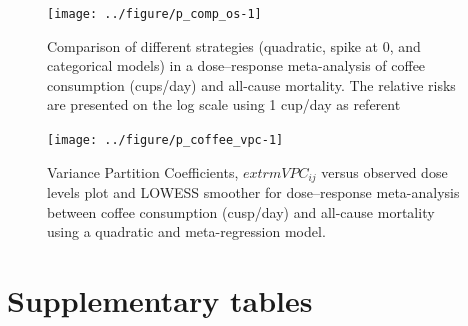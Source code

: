 \documentclass[11pt,a4paper,twoside,openany]{book}\usepackage{knitr}
\begin{document}
{\begin{knitrout}
\begin{figure}[ht!]
{\centering \texttt{[image: ../figure/p\_comp\_os-1]} 

}

\caption[Comparison of different strategies (quadratic, spike at 0, and categorical models) in a dose--response meta-analysis of coffee consumption (cups/day) and all-cause mortality]{Comparison of different strategies (quadratic, spike at 0, and categorical models) in a dose--response meta-analysis of coffee consumption (cups/day) and all-cause mortality. The relative risks are presented on the log scale using 1 cup/day as referent}\label{fig:p_comp_os}
\end{figure}


\end{knitrout}

\begin{knitrout}\footnotesize
{}\color{fgcolor}\begin{figure}[ht!]

{\centering \texttt{[image: ../figure/p\_coffee\_vpc-1]} 

}

\caption[Variance Partition Coefficients, $	extrm{VPC}_{ij}$ versus observed dose levels plot and LOWESS smoother for dose--response meta-analysis between coffee consumption (cusp/day) and all-cause mortality using a quadratic and meta-regression model]{Variance Partition Coefficients, $	extrm{VPC}_{ij}$ versus observed dose levels plot and LOWESS smoother for dose--response meta-analysis between coffee consumption (cusp/day) and all-cause mortality using a quadratic and meta-regression model.}\label{fig:p_coffee_vpc}
\end{figure}


\end{knitrout}



\chapter{Supplementary tables}

\begin{knitrout}\footnotesize
{}\color{fgcolor}\begin{table}[!h]


\end{table}
\end{knitrout}}
\end{document}
